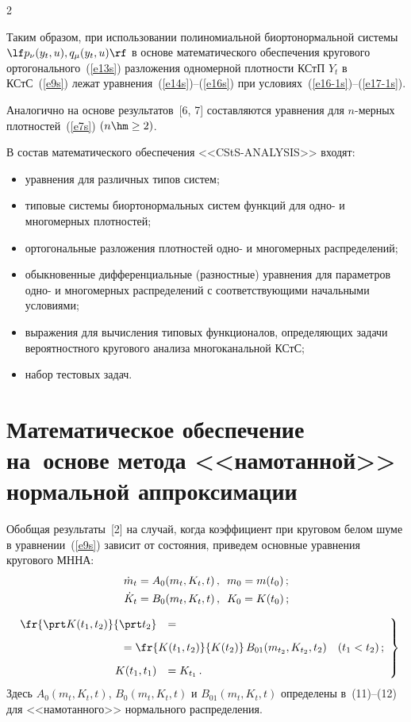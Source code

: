 \begin{multicols}{2}
\smallskip

Таким образом, при использовании полиномиальной биортонормальной сис\-те\-мы  
$\lf p_\nu (y_t,u), q_\mu (y_t,u)\rf$ в основе математического обеспечения 
кругового ортогонального~(\ref{e13s}) разложения одномерной плотности КСтП  
$Y_t$ в КСтС~(\ref{e9s}) лежат уравнения~(\ref{e14s})--(\ref{e16s}) при условиях~(\ref{e16-1s})--(\ref{e17-1s}).

Аналогично на основе результатов~[6, 7] составляются уравнения для $n$-мер\-ных 
плот\-но\-стей~(\ref{e7s}) $(n\hm\ge 2)$.

В состав математического обеспечения  <<CStS-ANALYSIS>> входят:
\begin{itemize}
\item
уравнения для различных типов систем;
\item
типовые системы биортонормальных сис\-тем функций для одно- и многомерных плотностей;
\item
ортогональные разложения плотностей одно- и многомерных распределений;
\item
обыкновенные дифференциальные (разностные) уравнения для параметров одно- и 
многомерных распределений с соответствующими начальными условиями;
\item
выражения для вычисления типовых функционалов, определяющих задачи вероятностного 
кругового анализа многоканальной КСтС;
\item
набор тестовых задач.
\end{itemize}

\section{Математическое обеспечение на~основе метода <<намотанной>> нормальной аппроксимации}

Обобщая результаты~[2] на случай, когда коэффициент при круговом белом шуме в 
уравнении~(\ref{e9s}) 
зависит от состояния, приведем основные уравнения кругового МННА:
\begin{align}
\dot m_t &=A_0 (m_t, K_t, t)\,,\enskip m_0 = m(t_0)\,;\label{e18s}\\
\dot K_t &=B_0 (m_t, K_t, t)\,,\enskip K_0 = K(t_0)\,;\label{e19s}
\end{align}

\noindent
\begin{equation}
\left.
\begin{array}{rl}
\fr{\prt K(t_1, t_2)}{\prt t_2} &=\\[9pt] 
&\hspace*{-15mm}{}=\fr{K(t_1, t_2)}{K(t_2)}\, B_{01}(m_{t_2}, K_{t_2}, t_2)\quad 
(t_1< t_2)\,;\\[9pt]
 K(t_1, t_1) &= K_{t_1}\,.
 \end{array}
 \right\}
 \label{e20s}
\end{equation}
Здесь  $A_0(m_t, K_t, t)$, $B_0(m_t, K_t, t)$ и $B_{01}(m_t, K_t, t)$  
определены в~(11)--(12) для 
<<намотанного>> нормального распределения.


\end{multicols}
